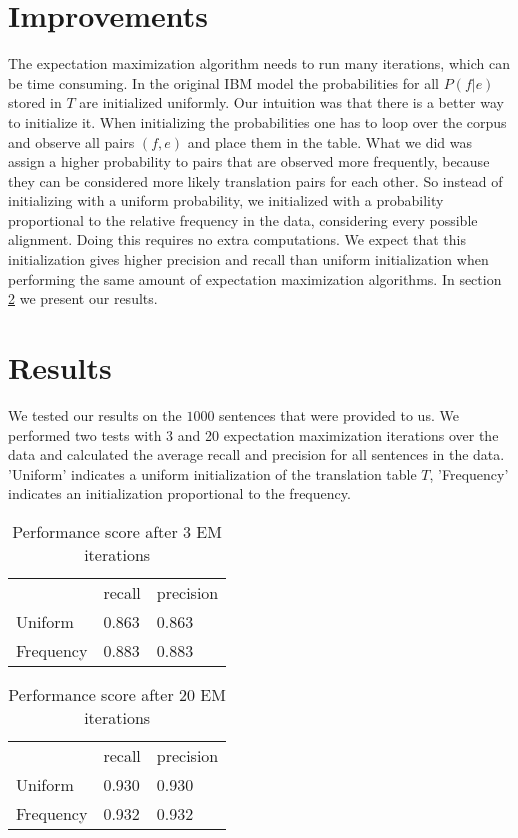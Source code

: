 \documentclass[11pt]{article}
\begin{document}
\section{Improvements}
\label{own}
The expectation maximization algorithm needs to run many iterations, which can be time consuming. In the original IBM model the probabilities for all $P(f|e)$ stored in $T$ are initialized uniformly. Our intuition was that there is a better way to initialize it. When initializing the probabilities one has to loop over the corpus and observe all pairs $(f,e)$ and place them in the table. What we did was assign a higher probability to pairs that are observed more frequently, because they can be considered more likely translation pairs for each other. So instead of initializing with a uniform probability, we initialized with a probability proportional to the relative frequency in the data, considering every possible alignment. Doing this requires no extra computations. We expect that this initialization gives higher precision and recall than uniform initialization when performing the same amount of expectation maximization algorithms. In section \ref{results} we present our results.

\section{Results}
\label{results}
We tested our results on the $1000$ sentences that were provided to us. We performed two tests with 3 and 20 expectation maximization iterations over the data and calculated the average recall and precision for all sentences in the data. 'Uniform' indicates a uniform initialization of the translation table $T$, 'Frequency' indicates an initialization proportional to the frequency.

\begin{table}[H]
    \begin{tabular}{lll}
    ~ & recall  & precision \\
    Uniform & 0.863 & 0.863 \\
    Frequency & 0.883 & 0.883 \\
    \end{tabular}
    \caption{Performance score after 3 EM iterations}
\end{table}

\begin{table}[H]
    \begin{tabular}{lll}
    ~ & recall  & precision \\
    Uniform & 0.930 & 0.930 \\
    Frequency & 0.932 & 0.932 \\
    \end{tabular}
    \caption{Performance score after 20 EM iterations}
\end{table}
\end{document}
